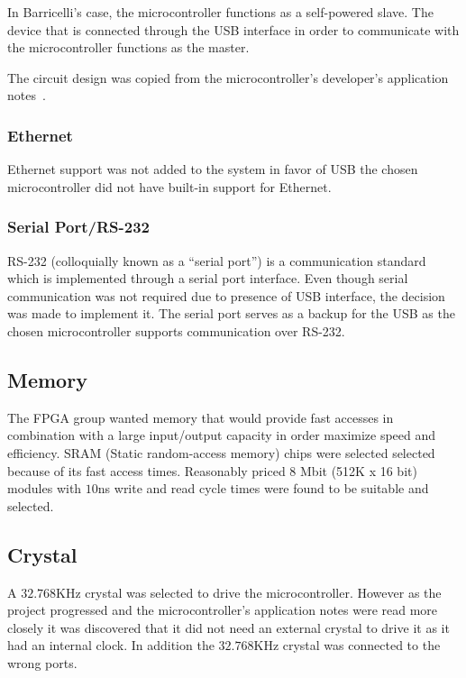 In Barricelli's case, the microcontroller functions as a self-powered slave.
The device that is connected through the USB interface in order to communicate with the microcontroller functions as the master.

The circuit design was copied from the microcontroller's developer's application notes~\cite[Figure 2.2]{an0046}.

\subsubsection{Ethernet}
Ethernet support was not added to the system in favor of USB the chosen microcontroller did not have built-in support for Ethernet.


\subsubsection{Serial Port/RS-232} 
RS-232 (colloquially known as a ``serial port'') is a communication standard which is implemented through a serial port interface.
Even though serial communication was not required due to presence of USB interface, the decision was made to implement it.
The serial port serves as a backup for the USB as the chosen microcontroller supports communication over RS-232.

\subsection{Memory} \label{pcb:design-choices:ss:memory}
The FPGA group wanted memory that would provide fast accesses in combination with a large input/output capacity in order maximize speed and efficiency.
SRAM (Static random-access memory) chips were selected selected because of its fast access times.
Reasonably priced 8 Mbit (512K x 16 bit) modules with $10$ns write and read cycle times were found to be suitable and selected. 

\subsection{Crystal}
A $32.768$KHz crystal was selected to drive the microcontroller.
However as the project progressed and the microcontroller's application notes were read more closely it was discovered that it did not need an external crystal to drive it as it had an internal clock.
In addition the $32.768$KHz crystal was connected to the wrong ports. 
